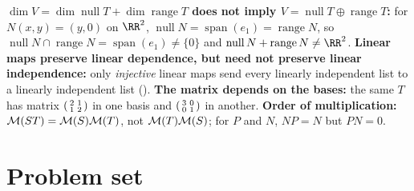 \documentclass[10pt]{scrartcl}
\DeclareMathOperator{\spn}{span}\DeclareMathOperator{\nul}{null}\DeclareMathOperator{\range}{range}
\begin{document}
\begin{trapbox}
  \ii \textbf{$\dim V=\dim\nul T+\dim\range T$ does not imply $V=\nul T\oplus\range T$:} for $N(x,y)=(y,0)$ on $\RR^2$, $\nul N=\spn(e_1)=\range N$, so $\nul N\cap\range N=\spn(e_1)\ne\{0\}$ and $\nul N+\range N\ne\RR^2$.
  \ii \textbf{Linear maps preserve linear dependence, but need not preserve linear independence:} only \emph{injective} linear maps send every linearly independent list to a linearly independent list ().
  \ii \textbf{The matrix depends on the bases:} the same $T$ has matrix $\begin{psmallmatrix}2&1\\1&2\end{psmallmatrix}$ in one basis and $\begin{psmallmatrix}3&0\\0&1\end{psmallmatrix}$ in another.
  \ii \textbf{Order of multiplication:} $\mathcal M(ST)=\mathcal M(S)\mathcal M(T)$, not $\mathcal M(T)\mathcal M(S)$; for $P$ and $N$, $NP=N$ but $PN=0$.
\end{trapbox}

\section{Problem set}
\end{document}
